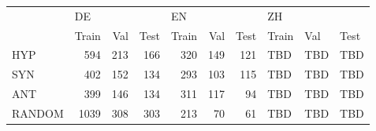 \begin{tabular}{lrrrrrrlll}
\toprule
{} & \multicolumn{3}{l}{DE} & \multicolumn{3}{l}{EN} & \multicolumn{3}{l}{ZH} \\
{} & Train &  Val & Test & Train &  Val & Test & Train &  Val & Test \\
\midrule
HYP    &   594 &  213 &  166 &   320 &  149 &  121 &   TBD &  TBD &  TBD \\
SYN    &   402 &  152 &  134 &   293 &  103 &  115 &   TBD &  TBD &  TBD \\
ANT    &   399 &  146 &  134 &   311 &  117 &   94 &   TBD &  TBD &  TBD \\
RANDOM &  1039 &  308 &  303 &   213 &   70 &   61 &   TBD &  TBD &  TBD \\
\bottomrule
\end{tabular}
